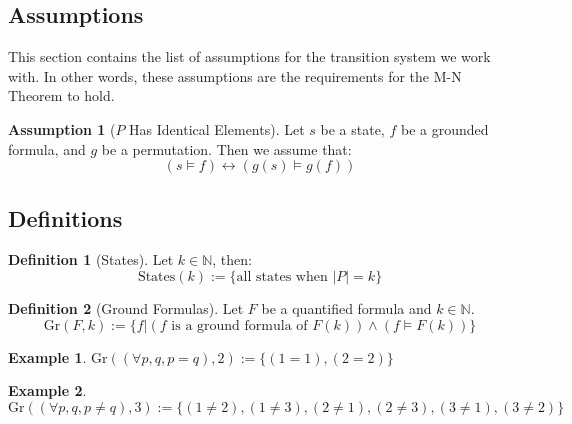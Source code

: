 \documentclass[12pt]{article}
\theoremstyle{definition}
\newtheorem{assumption}{Assumption}
\newtheorem{definition}{Definition}
\newtheorem{example}{Example}
\theoremstyle{remark}
\newcommand{\states}{\text{States}}
\newcommand{\gr}{\text{Gr}}
\begin{document}
\subsection{Assumptions}
This section contains the list of assumptions for the transition system we work with.  In other words, these assumptions are the requirements for the M-N Theorem to hold.

\begin{assumption}[$P$ Has Identical Elements]
  \label{asmp:ident}
  Let $s$ be a state, $f$ be a grounded formula, and $g$ be a permutation.  Then we assume that:
  $$(s \models f) \leftrightarrow (g(s) \models g(f))$$
\end{assumption}

\subsection{Definitions}
\begin{definition}[States]
  Let $k \in \mathbb{N}$, then:
  $$\states(k) := \{\text{all states when } |P|=k\}$$
\end{definition}

\begin{definition}[Ground Formulas]
  Let $F$ be a quantified formula and $k \in \mathbb{N}$.
  $$\gr(F,k) := \{f | (f \text{ is a ground formula of } F(k)) \land (f \models F(k))\}$$
\end{definition}

\begin{example}
  $\gr((\forall p,q, p=q),2) := \{(1=1),(2=2)\}$
\end{example}
\begin{example}
  $\gr((\forall p,q, p \neq q),3) := \{(1 \neq 2),(1 \neq 3),(2 \neq 1),(2 \neq 3),(3 \neq 1),(3 \neq 2)\}$
\end{example}
\end{document}
